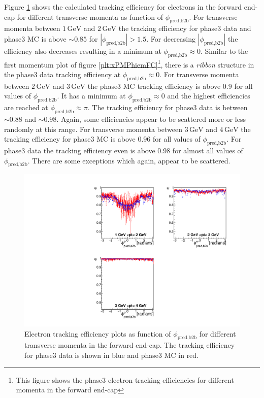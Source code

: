 \documentclass[a4paper,11pt,twosided,final,german,openbib,pdftex,listof=totoc,bibliography=totoc]{scrbook}
\begin{document}
Figure \ref{plt:xPtMPhiemFC3} shows the calculated tracking efficiency for electrons in the forward end-cap for different transverse momenta as function of $\phi_{\textrm{pred,b2b}}$. 
For transverse momenta between $1\,\textrm{GeV}$ and $2\,\textrm{GeV}$ the tracking efficiency for phase3 data and phase3 MC is above $\sim 0.85$ for $|\phi_{\textrm{pred,b2b}}| >1.5$. For decreasing $|\phi_{\textrm{pred,b2b}}|$ the efficiency also decreases resulting in a minimum at $\phi_{\textrm{pred,b2b}} \approx 0$. Similar to the first momentum plot of figure \ref{plt:xPMPhiemFC}\footnote{This figure shows the phase3 electron tracking efficiencies for different momenta in the forward end-cap}, there is a \textit{ribbon} structure in the phase3 data tracking efficiency at $\phi_{\textrm{pred,b2b}} \approx 0$.
For transverse momenta between $2\,\textrm{GeV}$ and $3\,\textrm{GeV}$ the phase3 MC tracking efficiency is above 0.9 for all values of $\phi_{\textrm{pred,b2b}}$. It has a minimum at $\phi_{\textrm{pred,b2b}} \approx 0$ and the highest efficiencies are reached at $\phi_{\textrm{pred,b2b}} \approx \pi$. The tracking efficiency for phase3 data is between $\sim 0.88$ and $\sim 0.98$. Again, some efficiencies appear to be scattered more or less randomly at this range. 
For transverse momenta between $3\,\textrm{GeV}$ and $4\,\textrm{GeV}$ the tracking efficiency for phase3 MC is above 0.96 for all values of $\phi_{\textrm{pred,b2b}}$. For phase3 data the tracking efficiency even is above 0.98 for almost all values of $\phi_{\textrm{pred,b2b}}$. There are some exceptions which again, appear to be scattered.


\begin{figure}[!htbp]
	\centering
	\includegraphics[width=\textwidth]{Plots/master3/xPtMPhiemFCP3}
	\caption[Transverse Momentum $\phi_{\textrm{pred,b2b}}$ Electron Forward End-Cap Efficiency Phase3]{Electron tracking efficiency plots as function of $\phi_{\textrm{pred,b2b}}$ for different transverse momenta in the forward end-cap. The tracking efficiency for phase3 data is shown in blue and phase3 MC in red.}
	\label{plt:xPtMPhiemFC3}
\end{figure}
\end{document}

